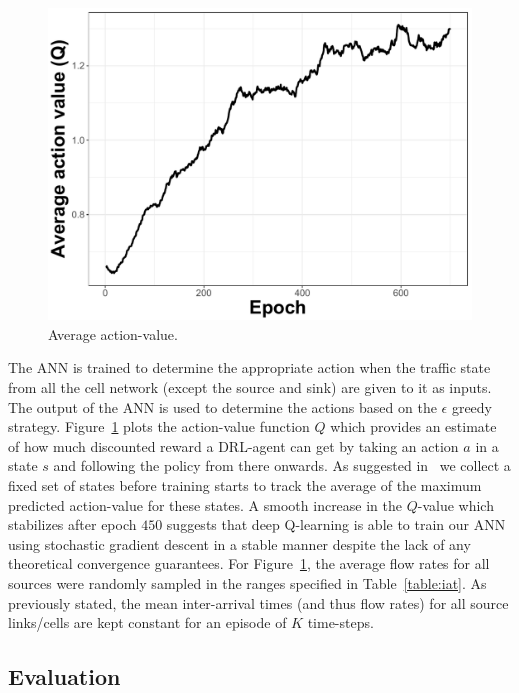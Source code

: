 \documentclass[conference]{IEEEtran}
\begin{document}
\begin{figure}[b]
	\centering
	\includegraphics[scale=0.35]{images/Qvalue.pdf}
	
	\caption{Average action-value.}
	\label{fig:q-value}
\end{figure}
The \ac{ANN} is trained to determine the appropriate action when the traffic state from all the cell network (except the source and sink) are given to it as inputs. The output of the \ac{ANN} is used to determine the actions based on the $\epsilon$ greedy strategy. Figure~\ref{fig:q-value} plots the action-value function $Q$ which provides an estimate of how much discounted reward a DRL-agent can get by taking an action $a$ in a state $s$ and following the policy from there onwards. As suggested in~\cite{mnih2015human} we collect a fixed set of states  before training starts to track the average of the maximum predicted action-value for these states.
A smooth increase in the $Q$-value which stabilizes after epoch $450$ suggests that deep Q-learning is able to train our \ac{ANN} using stochastic gradient descent in a stable manner despite the lack of any theoretical convergence guarantees.
For Figure~\ref{fig:q-value}, the average flow rates for all sources were randomly sampled in the ranges specified in Table~\ref{table:iat}. As previously stated, the mean inter-arrival times (and thus flow rates) for all source links/cells are kept constant for an episode of $K$ time-steps.


\subsection{Evaluation}
\label{subsec:results}
\end{document}
